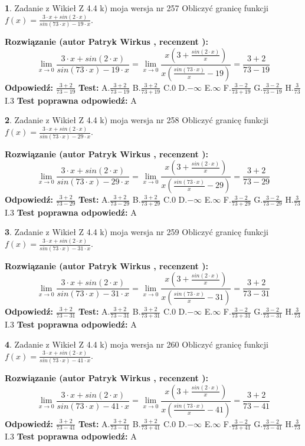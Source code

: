 \documentclass[12pt, a4paper]{article}
\theoremstyle{definition} %
\newtheorem{zad}{}
\newcommand{\zadStart}[1]{\begin{zad}#1\newline}
\newcommand{\zadStop}{\end{zad}}
\newcommand{\rozwStart}[2]{\noindent \textbf{Rozwiązanie (autor #1 , recenzent #2): }\newline}
\newcommand{\rozwStop}{\newline}
\newcommand{\odpStart}{\noindent \textbf{Odpowiedź:}\newline}
\newcommand{\odpStop}{\newline}
\newcommand{\testStart}{\noindent \textbf{Test:}\newline}
\newcommand{\testStop}{\newline}
\newcommand{\kluczStart}{\noindent \textbf{Test poprawna odpowiedź:}\newline}
\newcommand{\kluczStop}{\newline}
\begin{document}
\zadStart{Zadanie z Wikieł Z 4.4 k) moja wersja nr 257}
Obliczyć granicę funkcji $f(x)=\frac{3\cdot x +sin(2\cdot x)}{sin(73\cdot x) -19\cdot x}$.
\zadStop
\rozwStart{Patryk Wirkus}{}
$$\lim\limits_{x\to 0}\frac{3\cdot x +sin(2\cdot x)}{sin(73\cdot x) -19\cdot x}
=\lim\limits_{x\to 0}\frac{x(3+\frac{sin(2\cdot x)}{x})}{x(\frac{sin(73\cdot x)}{x}-19)}
=\frac{3+2}{73-19}$$
\rozwStop
\odpStart
$\frac{3+2}{73-19}$
\odpStop
\testStart
A.$\frac{3+2}{73-19}$
B.$\frac{3+2}{73+19}$
C.$0$
D.$-\infty$
E.$\infty$
F.$\frac{3-2}{73+19}$
G.$\frac{3-2}{73-19}$
H.$\frac{3}{73}$
I.$3$
\testStop
\kluczStart
A
\kluczStop



\zadStart{Zadanie z Wikieł Z 4.4 k) moja wersja nr 258}
Obliczyć granicę funkcji $f(x)=\frac{3\cdot x +sin(2\cdot x)}{sin(73\cdot x) -29\cdot x}$.
\zadStop
\rozwStart{Patryk Wirkus}{}
$$\lim\limits_{x\to 0}\frac{3\cdot x +sin(2\cdot x)}{sin(73\cdot x) -29\cdot x}
=\lim\limits_{x\to 0}\frac{x(3+\frac{sin(2\cdot x)}{x})}{x(\frac{sin(73\cdot x)}{x}-29)}
=\frac{3+2}{73-29}$$
\rozwStop
\odpStart
$\frac{3+2}{73-29}$
\odpStop
\testStart
A.$\frac{3+2}{73-29}$
B.$\frac{3+2}{73+29}$
C.$0$
D.$-\infty$
E.$\infty$
F.$\frac{3-2}{73+29}$
G.$\frac{3-2}{73-29}$
H.$\frac{3}{73}$
I.$3$
\testStop
\kluczStart
A
\kluczStop



\zadStart{Zadanie z Wikieł Z 4.4 k) moja wersja nr 259}
Obliczyć granicę funkcji $f(x)=\frac{3\cdot x +sin(2\cdot x)}{sin(73\cdot x) -31\cdot x}$.
\zadStop
\rozwStart{Patryk Wirkus}{}
$$\lim\limits_{x\to 0}\frac{3\cdot x +sin(2\cdot x)}{sin(73\cdot x) -31\cdot x}
=\lim\limits_{x\to 0}\frac{x(3+\frac{sin(2\cdot x)}{x})}{x(\frac{sin(73\cdot x)}{x}-31)}
=\frac{3+2}{73-31}$$
\rozwStop
\odpStart
$\frac{3+2}{73-31}$
\odpStop
\testStart
A.$\frac{3+2}{73-31}$
B.$\frac{3+2}{73+31}$
C.$0$
D.$-\infty$
E.$\infty$
F.$\frac{3-2}{73+31}$
G.$\frac{3-2}{73-31}$
H.$\frac{3}{73}$
I.$3$
\testStop
\kluczStart
A
\kluczStop



\zadStart{Zadanie z Wikieł Z 4.4 k) moja wersja nr 260}
Obliczyć granicę funkcji $f(x)=\frac{3\cdot x +sin(2\cdot x)}{sin(73\cdot x) -41\cdot x}$.
\zadStop
\rozwStart{Patryk Wirkus}{}
$$\lim\limits_{x\to 0}\frac{3\cdot x +sin(2\cdot x)}{sin(73\cdot x) -41\cdot x}
=\lim\limits_{x\to 0}\frac{x(3+\frac{sin(2\cdot x)}{x})}{x(\frac{sin(73\cdot x)}{x}-41)}
=\frac{3+2}{73-41}$$
\rozwStop
\odpStart
$\frac{3+2}{73-41}$
\odpStop
\testStart
A.$\frac{3+2}{73-41}$
B.$\frac{3+2}{73+41}$
C.$0$
D.$-\infty$
E.$\infty$
F.$\frac{3-2}{73+41}$
G.$\frac{3-2}{73-41}$
H.$\frac{3}{73}$
I.$3$
\testStop
\kluczStart
A
\kluczStop
\end{document}
